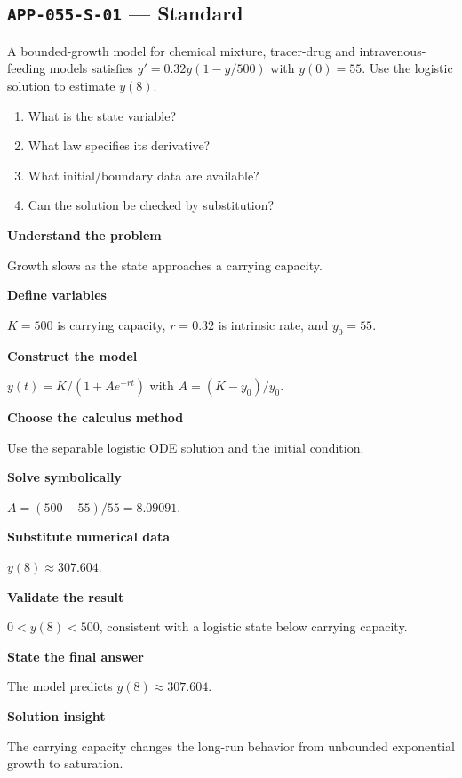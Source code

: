 \documentclass[11pt]{book}
\newcommand{\pid}[1]{\texttt{#1}}
\begin{document}
\subsection*{\pid{APP-055-S-01} — Standard}
\begin{problembox}
A bounded-growth model for chemical mixture, tracer-drug and intravenous-feeding models satisfies $y'=0.32y(1-y/500)$ with $y(0)=55$. Use the logistic solution to estimate $y(8)$.
\end{problembox}
\begin{promptbox}\begin{enumerate}
\item What is the state variable?
\item What law specifies its derivative?
\item What initial/boundary data are available?
\item Can the solution be checked by substitution?
\end{enumerate}\end{promptbox}
\begin{solutionbox}
\textbf{Understand the problem}\par Growth slows as the state approaches a carrying capacity.\par\medskip
\textbf{Define variables}\par $K=500$ is carrying capacity, $r=0.32$ is intrinsic rate, and $y_0=55$.\par\medskip
\textbf{Construct the model}\par $y(t)=K/(1+A e^{-rt})$ with $A=(K-y_0)/y_0$.\par\medskip
\textbf{Choose the calculus method}\par Use the separable logistic ODE solution and the initial condition.\par\medskip
\textbf{Solve symbolically}\par $A=(500-55)/55=8.09091$.\par\medskip
\textbf{Substitute numerical data}\par $y(8)\approx 307.604$.\par\medskip
\textbf{Validate the result}\par $0<y(8)<500$, consistent with a logistic state below carrying capacity.\par\medskip
\textbf{State the final answer}\par The model predicts $y(8)\approx 307.604$.\par\medskip
\textbf{Solution insight}\par The carrying capacity changes the long-run behavior from unbounded exponential growth to saturation.\par\medskip
\end{solutionbox}
\end{document}
